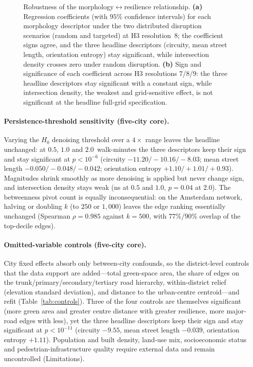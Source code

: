 \documentclass[sn-mathphys-num,pdflatex]{sn-jnl}
\begin{document}
\begin{figure}[t]\centering
{}
\caption{Robustness of the morphology$\leftrightarrow$resilience relationship.
\textbf{(a)} Regression coefficients (with $95\%$ confidence intervals) for each
morphology descriptor under the two distributed disruption scenarios (random and
targeted) at H3 resolution~8; the coefficient signs agree, and the three headline
descriptors (circuity, mean street length, orientation entropy) stay significant,
while intersection density crosses zero under random disruption. \textbf{(b)} Sign and
significance of each coefficient across H3 resolutions $7$/$8$/$9$: the three
headline descriptors stay significant with a constant sign, while intersection
density, the weakest and grid-sensitive effect, is not significant at the headline
full-grid specification.}
\label{fig:robustness}
\end{figure}

\paragraph{Persistence-threshold sensitivity (five-city core).} Varying the $H_0$ denoising
threshold over a $4\times$ range leaves the headline unchanged: at $0.5$, $1.0$ and
$2.0$~walk-minutes the three descriptors keep their sign and stay significant at
$p<10^{-6}$ (circuity $-11.20/-10.16/-8.03$; mean street length
$-0.050/-0.048/-0.042$; orientation entropy $+1.10/+1.01/+0.93$). Magnitudes shrink
smoothly as more denoising is applied but never change sign, and intersection
density stays weak (ns at $0.5$ and $1.0$, $p=0.04$ at $2.0$). The betweenness pivot
count is equally inconsequential: on the Amsterdam network, halving or doubling $k$
(to $250$ or $1{,}000$) leaves the edge ranking essentially unchanged (Spearman
$\rho=0.985$ against $k{=}500$, with $77\%$/$90\%$ overlap of the top-decile edges).

\paragraph{Omitted-variable controls (five-city core).} City fixed effects absorb only between-city
confounds, so the district-level controls that the data support are added---total
green-space area, the share of edges on the trunk/primary/secondary/tertiary road
hierarchy, within-district relief (elevation standard deviation), and distance to
the urban-centre centroid---and refit (Table~\ref{tab:controls}). Three of the four
controls are themselves significant (more green area and greater centre distance
with greater resilience, more major-road edges with less), yet the three headline
descriptors keep their sign and stay significant at $p<10^{-11}$ (circuity $-9.55$,
mean street length $-0.039$, orientation entropy $+1.11$). Population and built
density, land-use mix, socioeconomic status and pedestrian-infrastructure quality
require external data and remain uncontrolled (Limitations).
\end{document}

